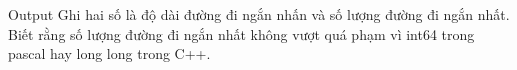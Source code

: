 Output
Ghi hai số là độ dài đường đi ngắn nhấn và số lượng đường đi ngắn nhất. Biết rằng số lượng đường đi ngắn nhất không vượt quá phạm vì int64 trong pascal  hay long long trong C++.